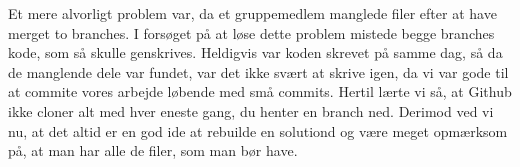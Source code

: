 Et mere alvorligt problem var, da et gruppemedlem manglede filer efter at have merget to branches.
I forsøget på at løse dette problem mistede begge branches kode, som så skulle genskrives.
Heldigvis var koden skrevet på samme dag, så da de manglende dele var fundet, var det ikke svært at skrive igen, da vi var gode til at commite vores arbejde løbende med små commits.
Hertil lærte vi så, at Github ikke cloner alt med hver eneste gang, du henter en branch ned.
Derimod ved vi nu, at det altid er en god ide at rebuilde en solutiond og være meget opmærksom på, at man har alle de filer, som man bør have.